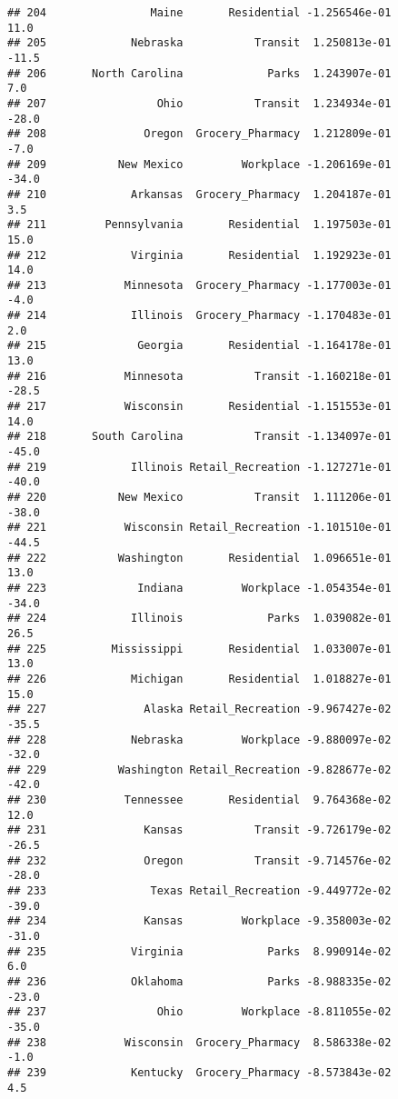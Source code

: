 \documentclass[]{article}
\begin{document}
\begin{verbatim}
## 204                Maine       Residential -1.256546e-01          11.0
## 205             Nebraska           Transit  1.250813e-01         -11.5
## 206       North Carolina             Parks  1.243907e-01           7.0
## 207                 Ohio           Transit  1.234934e-01         -28.0
## 208               Oregon  Grocery_Pharmacy  1.212809e-01          -7.0
## 209           New Mexico         Workplace -1.206169e-01         -34.0
## 210             Arkansas  Grocery_Pharmacy  1.204187e-01           3.5
## 211         Pennsylvania       Residential  1.197503e-01          15.0
## 212             Virginia       Residential  1.192923e-01          14.0
## 213            Minnesota  Grocery_Pharmacy -1.177003e-01          -4.0
## 214             Illinois  Grocery_Pharmacy -1.170483e-01           2.0
## 215              Georgia       Residential -1.164178e-01          13.0
## 216            Minnesota           Transit -1.160218e-01         -28.5
## 217            Wisconsin       Residential -1.151553e-01          14.0
## 218       South Carolina           Transit -1.134097e-01         -45.0
## 219             Illinois Retail_Recreation -1.127271e-01         -40.0
## 220           New Mexico           Transit  1.111206e-01         -38.0
## 221            Wisconsin Retail_Recreation -1.101510e-01         -44.5
## 222           Washington       Residential  1.096651e-01          13.0
## 223              Indiana         Workplace -1.054354e-01         -34.0
## 224             Illinois             Parks  1.039082e-01          26.5
## 225          Mississippi       Residential  1.033007e-01          13.0
## 226             Michigan       Residential  1.018827e-01          15.0
## 227               Alaska Retail_Recreation -9.967427e-02         -35.5
## 228             Nebraska         Workplace -9.880097e-02         -32.0
## 229           Washington Retail_Recreation -9.828677e-02         -42.0
## 230            Tennessee       Residential  9.764368e-02          12.0
## 231               Kansas           Transit -9.726179e-02         -26.5
## 232               Oregon           Transit -9.714576e-02         -28.0
## 233                Texas Retail_Recreation -9.449772e-02         -39.0
## 234               Kansas         Workplace -9.358003e-02         -31.0
## 235             Virginia             Parks  8.990914e-02           6.0
## 236             Oklahoma             Parks -8.988335e-02         -23.0
## 237                 Ohio         Workplace -8.811055e-02         -35.0
## 238            Wisconsin  Grocery_Pharmacy  8.586338e-02          -1.0
## 239             Kentucky  Grocery_Pharmacy -8.573843e-02           4.5

\end{verbatim}
\end{document}
